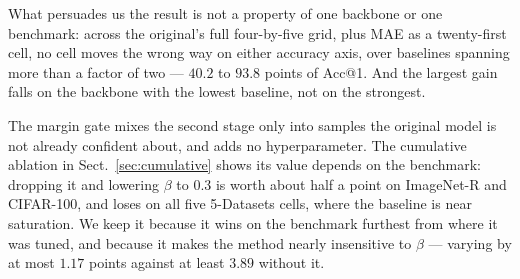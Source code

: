 \documentclass[11pt,a4paper]{article}
\begin{document}
What persuades us the result is not a property of one backbone or one
benchmark: across the original's full four-by-five grid, plus MAE as a
twenty-first cell, no cell moves the wrong way on either accuracy axis,
over baselines spanning more than a factor of two --- $40.2$ to $93.8$
points of Acc@1. And the largest gain falls on the backbone with the lowest
baseline, not on the strongest.

The margin gate mixes the second stage only into samples the original model is
not already confident about, and adds no hyperparameter. The cumulative ablation
in Sect.~\ref{sec:cumulative} shows its value depends on the benchmark:
dropping it and lowering $\beta$ to $0.3$ is worth about half a point on
ImageNet-R and CIFAR-100, and loses on all five 5-Datasets cells, where the
baseline is near saturation. We keep it because it wins on the benchmark
furthest from where it was tuned, and because it makes the method nearly
insensitive to $\beta$ --- varying by at most $1.17$ points against at least
$3.89$ without it.


\end{document}
